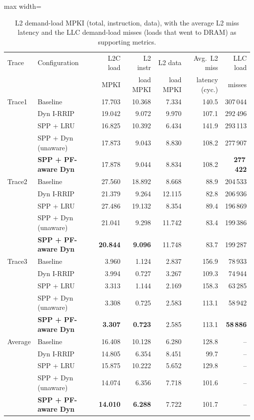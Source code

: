 \documentclass[11pt]{article}
\begin{document}
\begin{table}[H]
\centering
\small
\begin{adjustbox}{max width=\textwidth}
\begin{tabular}{llrrrrr}
\toprule
Trace & Configuration & L2C load & L2 instr & L2 data & Avg.\ L2 miss & LLC load \\
 & & MPKI & load MPKI & load MPKI & latency (cyc.) & misses \\
\midrule
Trace1 & Baseline & 17.703 & 10.368 & 7.334 & 140.5 & 307\,044 \\
 & Dyn I-RRIP & 19.042 & 9.072 & 9.970 & 107.1 & 292\,496 \\
 & SPP + LRU & 16.825 & 10.392 & 6.434 & 141.9 & 293\,113 \\
 & SPP + Dyn (unaware) & 17.873 & 9.043 & 8.830 & 108.2 & 277\,907 \\
 & \textbf{SPP + PF-aware Dyn} & 17.878 & 9.044 & 8.834 & 108.2 & \textbf{277\,422} \\
\midrule
Trace2 & Baseline & 27.560 & 18.892 & 8.668 & 88.9 & 204\,533 \\
 & Dyn I-RRIP & 21.379 & 9.264 & 12.115 & 82.8 & 206\,936 \\
 & SPP + LRU & 27.486 & 19.132 & 8.354 & 89.4 & 196\,869 \\
 & SPP + Dyn (unaware) & 21.041 & 9.298 & 11.742 & 83.4 & 199\,386 \\
 & \textbf{SPP + PF-aware Dyn} & \textbf{20.844} & \textbf{9.096} & 11.748 & 83.7 & 199\,287 \\
\midrule
Trace3 & Baseline & 3.960 & 1.124 & 2.837 & 156.9 & 78\,933 \\
 & Dyn I-RRIP & 3.994 & 0.727 & 3.267 & 109.3 & 74\,944 \\
 & SPP + LRU & 3.313 & 1.144 & 2.169 & 158.3 & 63\,285 \\
 & SPP + Dyn (unaware) & 3.308 & 0.725 & 2.583 & 113.1 & 58\,942 \\
 & \textbf{SPP + PF-aware Dyn} & \textbf{3.307} & \textbf{0.723} & 2.585 & 113.1 & \textbf{58\,886} \\
\midrule
Average & Baseline & 16.408 & 10.128 & 6.280 & 128.8 & -- \\
 & Dyn I-RRIP & 14.805 & 6.354 & 8.451 & 99.7 & -- \\
 & SPP + LRU & 15.875 & 10.222 & 5.652 & 129.8 & -- \\
 & SPP + Dyn (unaware) & 14.074 & 6.356 & 7.718 & 101.6 & -- \\
 & \textbf{SPP + PF-aware Dyn} & \textbf{14.010} & \textbf{6.288} & 7.722 & 101.7 & -- \\
\bottomrule
\end{tabular}
\end{adjustbox}
\caption{L2 demand-load MPKI (total, instruction, data), with the average L2 miss latency and
the LLC demand-load misses (loads that went to DRAM) as supporting metrics.}
\label{tab:mainl2}
\end{table}
\end{document}
